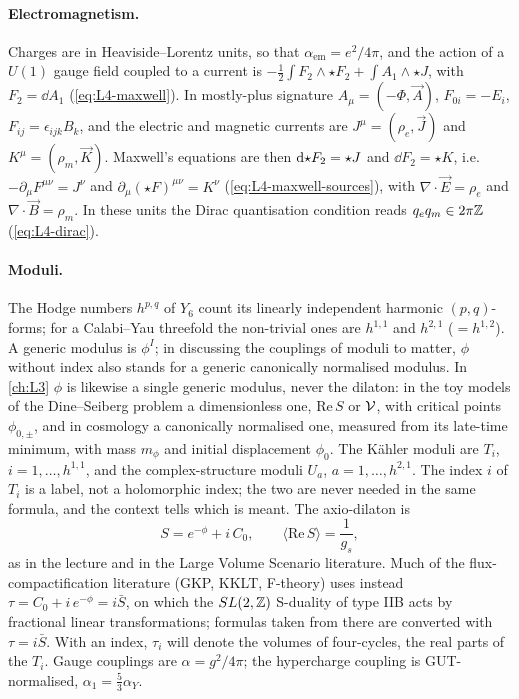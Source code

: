 \paragraph{Electromagnetism.} Charges are in Heaviside--Lorentz units, so that $\alpha_{\mathrm{em}} = e^2/4\pi$, and the action of a $U(1)$ gauge field coupled to a current is $-\frac12\int F_2\wedge\star F_2 + \int A_1\wedge\star J$, with $F_2 = \dd A_1$ (\cref{eq:L4-maxwell}). In mostly-plus signature $A_\mu = (-\Phi,\vec A)$, $F_{0i} = -E_i$, $F_{ij} = \epsilon_{ijk}B_k$, and the electric and magnetic currents are $J^\mu = (\rho_e,\vec J)$ and $K^\mu = (\rho_m,\vec K)$. Maxwell's equations are then $\mathrm{d}\mathord{\star} F_2 = \star J$ and $\dd F_2 = \star K$, i.e.\ $-\partial_\mu F^{\mu\nu} = J^\nu$ and $\partial_\mu(\star F)^{\mu\nu} = K^\nu$ (\cref{eq:L4-maxwell-sources}), with $\nabla\cdot\vec E = \rho_e$ and $\nabla\cdot\vec B = \rho_m$. In these units the Dirac quantisation condition reads $q_eq_m\in2\pi\mathbb{Z}$ (\cref{eq:L4-dirac}).

\paragraph{Moduli.} The Hodge numbers $h^{p,q}$ of $Y_6$ count its linearly independent harmonic $(p,q)$-forms; for a Calabi--Yau threefold the non-trivial ones are $h^{1,1}$ and $h^{2,1}$ ($=h^{1,2}$). A generic modulus is $\phi^I$; in discussing the couplings of moduli to matter, $\phi$ without index also stands for a generic canonically normalised modulus. In \cref{ch:L3} $\phi$ is likewise a single generic modulus, never the dilaton: in the toy models of the Dine--Seiberg problem a dimensionless one, $\mathrm{Re}\,S$ or $\mathcal{V}$, with critical points $\phi_{0,\pm}$, and in cosmology a canonically normalised one, measured from its late-time minimum, with mass $m_\phi$ and initial displacement $\phi_0$. The Kähler moduli are $T_i$, $i = 1,\dots,h^{1,1}$, and the complex-structure moduli $U_a$, $a = 1,\dots,h^{2,1}$. The index $i$ of $T_i$ is a label, not a holomorphic index; the two are never needed in the same formula, and the context tells which is meant. The axio-dilaton is
\begin{equation*}
  S = e^{-\phi} + i\,C_0 ,\qquad \langle\mathrm{Re}\,S\rangle = \frac{1}{g_s} ,
\end{equation*}
as in the lecture and in the Large Volume Scenario literature. Much of the flux-compactification literature (GKP, KKLT, F-theory) uses instead $\tau = C_0 + i\,e^{-\phi} = i\bar S$, on which the $SL(2,\mathbb{Z})$ S-duality of type IIB acts by fractional linear transformations; formulas taken from there are converted with $\tau = i\bar S$. With an index, $\tau_i$ will denote the volumes of four-cycles, the real parts of the $T_i$. Gauge couplings are $\alpha = g^2/4\pi$; the hypercharge coupling is GUT-normalised, $\alpha_1 = \frac53\alpha_Y$.

